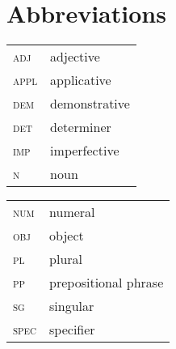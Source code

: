\documentclass[output=paper]{langscibook}
\begin{document}
\section*{Abbreviations}
\begin{tabularx}{.5\textwidth}{@{}lQ}
\textsc{adj}& adjective\\
 \textsc{appl}&applicative\\
 \textsc{dem} &demonstrative\\
 \textsc{det} &determiner\\
 \textsc{imp} &imperfective\\
 \textsc{n} &noun\\
 \end{tabularx}\begin{tabularx}{.5\textwidth}{lQ@{}}
 \textsc{num} &numeral\\
 \textsc{obj} &object\\
 \textsc{pl} &plural\\
 \textsc{pp} &prepositional phrase\\
 \textsc{sg} &singular\\
 \textsc{spec} &specifier\\
\end{tabularx}

\printbibliography[heading=subbibliography,notkeyword=this]
\end{document}
